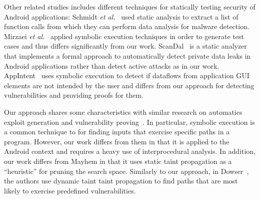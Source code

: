 Other related studies includes different techniques for statically testing 
security of Android applications: Schmidt \emph{et al.}~\cite{schmidt2009static} used static analysis to extract a 
list of function calls from which they can perform data analysis for malware 
detection. Mirzaei \emph{et al.}~\cite{mirzaei2012testing} applied symbolic execution techniques in order to generate test cases and thus differs significantly from our work. ScanDal~\cite{kim2012scandal} is a static analyzer that implements a formal approach to automatically detect private data leaks in Android applications rather than detect active attacks as in our work. AppIntent~\cite{AppIntent} uses symbolic execution to detect if dataflows from application GUI elements are not intended by the user and differs from our approach for detecting vulnerabilities and providing proofs for them. 

Our approach shares some characteristics with similar research on automatics exploit generation and vulnerability proving~\cite{Dowser,AEGBrumley}. In particular, symbolic execution is a common technique to for finding inputs that exercise specific paths in a program. However, our work differs from them in that it is applied to the Android context and requires a heavy use of interprocedural analysis. In addition, our work differs from Mayhem \cite{AEGBrumley} in that it uses static taint propagation as a ``heuristic'' for pruning the search space. Similarly to our approach, in Dowser~\cite{Dowser}, the authors use dynamic taint taint propagation to find paths that are most likely to exercise predefined vulnerabilities. 



